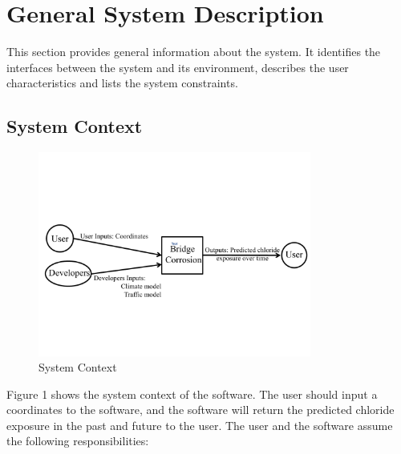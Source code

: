 \documentclass[12pt]{article}
\begin{document}
\section{General System Description}

This section provides general information about the system.  It identifies the
interfaces between the system and its environment, describes the user
characteristics and lists the system constraints.  
\subsection{System Context}
\begin{figure}[h!]
\begin{center}
 \includegraphics[width=0.8\textwidth]{SystemContextFigure}
\caption{System Context}
\label{Fig_SystemContext} 
\end{center}
\end{figure}


Figure 1 shows the system context of the software. The user should input a coordinates to the software, and the software will return the predicted chloride exposure in the past and future to the user. The user and the software assume the following responsibilities:
\end{document}
